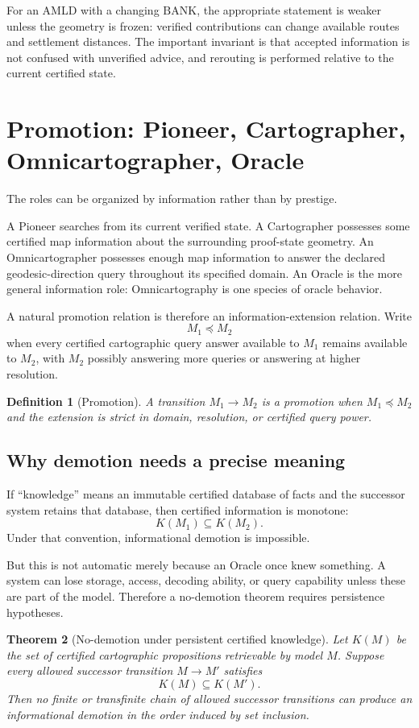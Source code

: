 \documentclass[11pt]{article}
\newtheorem{theorem}{Theorem}[section]
\newtheorem{definition}[theorem]{Definition}
\newcommand{\BANK}{\mathrm{BANK}}
\begin{document}
For an AMLD with a changing $\BANK$, the appropriate statement is weaker unless the geometry is frozen: verified contributions can change available routes and settlement distances. The important invariant is that accepted information is not confused with unverified advice, and rerouting is performed relative to the current certified state.

\section{Promotion: Pioneer, Cartographer, Omnicartographer, Oracle}
The roles can be organized by information rather than by prestige.

A Pioneer searches from its current verified state. A Cartographer possesses some certified map information about the surrounding proof-state geometry. An Omnicartographer possesses enough map information to answer the declared geodesic-direction query throughout its specified domain. An Oracle is the more general information role: Omnicartography is one species of oracle behavior.

A natural promotion relation is therefore an information-extension relation. Write
\[
M_1\preceq M_2
\]
when every certified cartographic query answer available to $M_1$ remains available to $M_2$, with $M_2$ possibly answering more queries or answering at higher resolution.

\begin{definition}[Promotion]
A transition $M_1\to M_2$ is a promotion when $M_1\preceq M_2$ and the extension is strict in domain, resolution, or certified query power.
\end{definition}

\subsection{Why demotion needs a precise meaning}
If ``knowledge'' means an immutable certified database of facts and the successor system retains that database, then certified information is monotone:
\[
K(M_1)\subseteq K(M_2).
\]
Under that convention, informational demotion is impossible.

But this is not automatic merely because an Oracle once knew something. A system can lose storage, access, decoding ability, or query capability unless these are part of the model. Therefore a no-demotion theorem requires persistence hypotheses.

\begin{theorem}[No-demotion under persistent certified knowledge]
Let $K(M)$ be the set of certified cartographic propositions retrievable by model $M$. Suppose every allowed successor transition $M\to M'$ satisfies
\[
K(M)\subseteq K(M').
\]
Then no finite or transfinite chain of allowed successor transitions can produce an informational demotion in the order induced by set inclusion.
\end{theorem}
\end{document}
